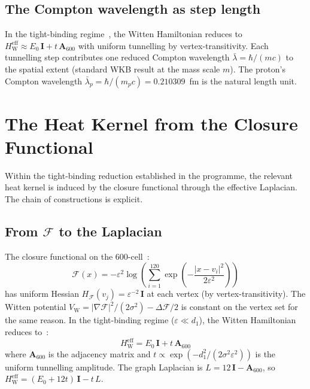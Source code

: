 \documentclass[12pt]{article}
\newcommand{\lbar}{\bar{\lambda}}
\newcommand{\Fcal}{\mathcal{F}}
\newcommand{\HW}{H_{\mathrm{W}}}
\newcommand{\VW}{V_{\mathrm{W}}}
\begin{document}
\subsection{The Compton wavelength as step length}

In the tight-binding regime~\citep{SmartXXII}, the Witten Hamiltonian reduces to $\HW^{\mathrm{eff}} \approx E_0\,\mathbf{I} + t\,\mathbf{A}_{600}$ with uniform tunnelling by vertex-transitivity. Each tunnelling step contributes one reduced Compton wavelength $\lbar = \hbar/(mc)$ to the spatial extent (standard WKB result at the mass scale $m$). The proton's Compton wavelength $\lbar_p = \hbar/(m_p c) = 0.210309$~fm is the natural length unit.

\section{The Heat Kernel from the Closure Functional}\label{sec:heatkernel}

Within the tight-binding reduction established in the programme, the relevant heat kernel is induced by the closure functional through the effective Laplacian. The chain of constructions is explicit.

\subsection{From $\Fcal$ to the Laplacian}

The closure functional on the 600-cell~\citep{SmartXXII}:
\begin{equation}\label{eq:closure_functional}
    \Fcal(x) = -\varepsilon^2 \log\!\left(\sum_{i=1}^{120} \exp\!\left(-\frac{|x - v_i|^2}{2\varepsilon^2}\right)\right)
\end{equation}
has uniform Hessian $H_\Fcal(v_j) = \varepsilon^{-2}\,\mathbf{I}$ at each vertex (by vertex-transitivity). The Witten potential $\VW = |\nabla\Fcal|^2/(2\sigma^2) - \Delta\Fcal/2$ is constant on the vertex set for the same reason. In the tight-binding regime ($\varepsilon \ll d_1$), the Witten Hamiltonian reduces to~\citep{SmartXXII}:
\begin{equation}
    \HW^{\mathrm{eff}} = E_0\,\mathbf{I} + t\,\mathbf{A}_{600}
\end{equation}
where $\mathbf{A}_{600}$ is the adjacency matrix and $t \propto \exp(-d_1^2/(2\sigma^2\varepsilon^2))$ is the uniform tunnelling amplitude. The graph Laplacian is $L = 12\,\mathbf{I} - \mathbf{A}_{600}$, so $\HW^{\mathrm{eff}} = (E_0 + 12t)\,\mathbf{I} - t\,L$.
\end{document}

